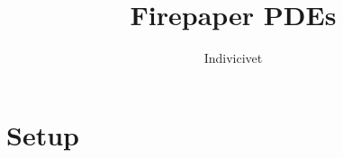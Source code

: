 \documentclass[]{article}
\title{Firepaper PDEs}
\author{Indivicivet}
\begin{document}
\date{}
\maketitle

\section{Setup}
\end{document}
